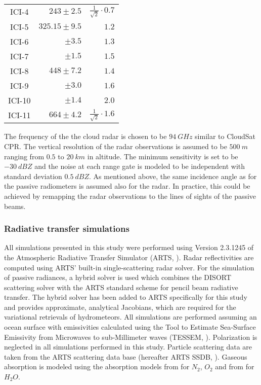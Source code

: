 \documentclass[journal abbreviation, manuscript]{copernicus}
\begin{document}
\begin{table}[hbpt]
\begin{tabular}{c|r|r}
    ICI-4  & $243    \pm 2.5$ & $\frac{1}{\sqrt{2}} \cdot 0.7$\\
    ICI-5  & $325.15 \pm 9.5$ & $1.2$\\
    ICI-6  & $       \pm 3.5$ & $1.3$\\
    ICI-7  & $       \pm 1.5$ & $1.5$\\
    ICI-8  & $448    \pm 7.2$ & $1.4$\\
    ICI-9  & $       \pm 3.0$ & $1.6$\\
    ICI-10 & $       \pm 1.4$ & $2.0$\\
    ICI-11 & $664    \pm 4.2$ & $\frac{1}{\sqrt{2}} \cdot 1.6$\\
    \end{tabular}
\end{table}

The frequency of the the cloud radar is chosen to be $94\ \unit{GHz}$ similar to
CloudSat CPR. The vertical resolution of the radar observations is assumed to be
$500\ \unit{m}$ ranging from $0.5$ to $20\ \unit{km}$ in altitude. The minimum
sensitivity is set to be $-30\ \unit{dBZ}$ and the noise at each range gate is
modeled to be independent with standard deviation $0.5\ \unit{dBZ}$. As mentioned
above, the same incidence angle as for the passive radiometers is assumed also
for the radar. In practice, this could be achieved by remapping the radar
observations to the lines of sights of the passive beams.

\subsubsection{Radiative transfer simulations}
\label{sec:orge741b86}

All simulations presented in this study were performed using Version 2.3.1245 of
the Atmospheric Radiative Transfer Simulator (ARTS, \cite{arts18}). Radar
reflectivities are computed using ARTS' built-in single-scattering radar solver.
For the simulation of passive radiances, a hybrid solver is used which combines
the DISORT \citep{disort00} scattering solver with the ARTS standard scheme for
pencil beam radiative transfer. The hybrid solver has been added to ARTS
specifically for this study and provides approximate, analytical Jacobians,
which are required for the variational retrievals of hydrometeors. All
simulations are performed assuming an ocean surface with emissivities calculated
using the Tool to Estimate Sea‐Surface Emissivity from Microwaves to
sub‐Millimeter waves (TESSEM, \cite{prigent16}). Polarization is neglected in
all simulations performed in this study. Particle scattering data are taken from
the ARTS scattering data base (hereafter ARTS SSDB, \citet{eriksson18}). Gaseous
absorption is modeled using the absorption models from \cite{rosenkranz93}
for $N_2$, $O_2$ and from \cite{rosenkranz98}  for $H_2O$.
\end{document}
